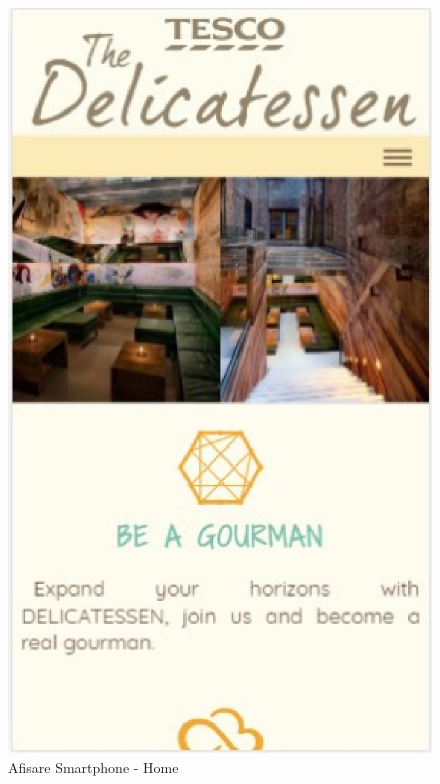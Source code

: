 \documentclass[11pt]{article}
\begin{document}
\begin{figure}[h]
\includegraphics{images/7.eps}
\caption{Afisare Smartphone - Home}
\end{figure}
\end{document}
